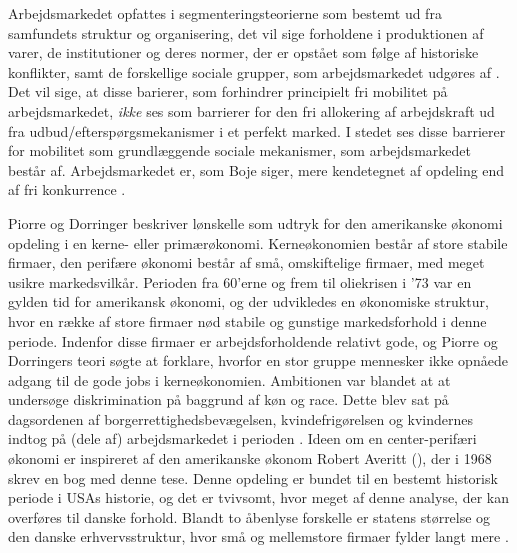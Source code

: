 Arbejdsmarkedet opfattes i segmenteringsteorierne som bestemt ud fra samfundets struktur og organisering, det vil sige forholdene i produktionen af varer, de institutioner og deres normer, der er opstået som følge af historiske konflikter, samt de forskellige sociale grupper, som arbejdsmarkedet udgøres af \parencite[9]{Boje1985}. Det  vil sige, at disse barierer, som forhindrer principielt fri mobilitet på arbejdsmarkedet, \emph{ikke} ses som barrierer for den fri allokering af arbejdskraft ud fra udbud/efterspørgsmekanismer i et perfekt marked. I stedet ses disse barrierer for mobilitet som grundlæggende sociale mekanismer, som arbejdsmarkedet består af. Arbejdsmarkedet er, som Boje siger, mere kendetegnet af opdeling end af fri konkurrence \parencite[8]{Boje1985}. 


Piorre og Dorringer beskriver lønskelle som udtryk for den amerikanske økonomi opdeling i en kerne- eller primærøkonomi. Kerneøkonomien består af store stabile firmaer, den perifære økonomi består af små, omskiftelige firmaer, med meget usikre markedsvilkår. %
Perioden fra 60'erne og frem til oliekrisen i '73 var en gylden tid for amerikansk økonomi, og der udvikledes en økonomiske struktur, hvor en række af store firmaer nød stabile og gunstige markedsforhold i denne periode. %
Indenfor disse firmaer er arbejdsforholdende relativt gode, og Piorre og Dorringers teori søgte at forklare, hvorfor en stor gruppe mennesker ikke opnåede adgang til de gode jobs i kerneøkonomien. Ambitionen var blandet at at undersøge diskrimination på baggrund af køn og race. Dette blev sat på dagsordenen af borgerrettighedsbevægelsen, kvindefrigørelsen og kvindernes indtog på (dele af) arbejdsmarkedet i perioden \parencites[1216]{Cain1976}. Ideen om en center-perifæri økonomi er inspireret af den amerikanske økonom Robert Averitt (\citeyear{Averitt1968}), der i 1968 skrev en bog med denne tese. Denne opdeling er bundet til en bestemt historisk periode i USAs historie, og det er tvivsomt, hvor meget af denne analyse, der kan overføres til danske forhold. Blandt to åbenlyse forskelle er statens størrelse og den danske erhvervsstruktur, hvor små og mellemstore firmaer fylder langt mere \parencite[36,120]{Boje1985}.  %

